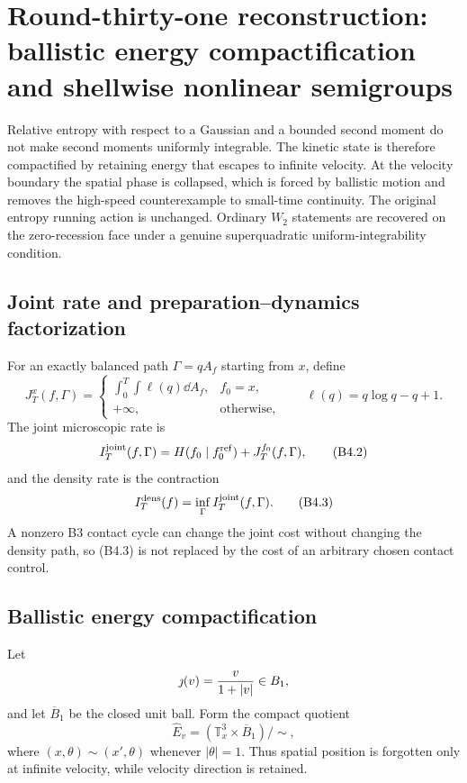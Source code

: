 \section{Round-thirty-one reconstruction: ballistic energy compactification and shellwise nonlinear semigroups}
\label{sec:r31-b4}

Relative entropy with respect to a Gaussian and a bounded second moment do not
make second moments uniformly integrable.  The kinetic state is therefore
compactified by retaining energy that escapes to infinite velocity.  At the
velocity boundary the spatial phase is collapsed, which is forced by ballistic
motion and removes the high-speed counterexample to small-time continuity.
The original entropy running action is unchanged.  Ordinary $W_2$ statements
are recovered on the zero-recession face under a genuine superquadratic
uniform-integrability condition.

\subsection{Joint rate and preparation--dynamics factorization}

For an exactly balanced path $\Gamma=qA_f$ starting from $x$, define
\[
 J_T^x(f,\Gamma)=
 \begin{cases}
 \displaystyle\int_0^T\!\int\ell(q)\dd A_f,&f_0=x,\\
 +\infty,&\text{otherwise},
 \end{cases}
 \qquad \ell(q)=q\log q-q+1.                              \tag{B4.1}
\]
The joint microscopic rate is
\[
 I_T^{\rm joint}(f,\Gamma)
 =H(f_0\mid f_0^{\rm ref})+J_T^{f_0}(f,\Gamma),            \tag{B4.2}
\]
and the density rate is the contraction
\[
 I_T^{\rm dens}(f)=\inf_\Gamma I_T^{\rm joint}(f,\Gamma). \tag{B4.3}
\]
A nonzero B3 contact cycle can change the joint cost without changing the
density path, so (B4.3) is not replaced by the cost of an arbitrary chosen
contact control.

\subsection{Ballistic energy compactification}

Let
\[
 \jmath(v)={v\over1+|v|}\in B_1,
\]
and let $\overline B_1$ be the closed unit ball.  Form the compact quotient
\[
 \widehat E_v=
 (\mathbb T^3_x\times\overline B_1)/\sim,                 \tag{B4.4}
\]
where $(x,\theta)\sim(x',\theta)$ whenever $|\theta|=1$.
Thus spatial position is forgotten only at infinite velocity, while velocity
direction is retained.

